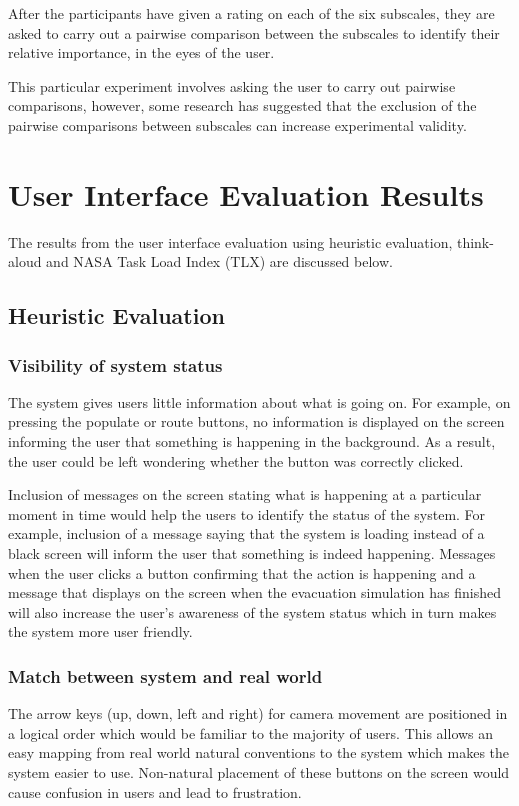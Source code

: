 After the participants have given a rating on each of the six subscales, they are asked to carry out a pairwise comparison between the subscales to identify their relative importance, in the eyes of the user.

This particular experiment involves asking the user to carry out pairwise comparisons, however, some research has suggested that the exclusion of the pairwise comparisons between subscales can increase experimental validity\cite{tlxinvariance}.

\section{User Interface Evaluation Results}
\label{results}

The results from the user interface evaluation using heuristic evaluation, think-aloud and NASA Task Load Index (TLX) are discussed below.

\subsection{Heuristic Evaluation}
\subsubsection{Visibility of system status}
The system gives users little information about what is going on. For example, on pressing the populate or route buttons, no information is displayed on the screen informing the user that something is happening in the background. As a result, the user could be left wondering whether the button was correctly clicked.

Inclusion of messages on the screen stating what is happening at a particular moment in time would help the users to identify the status of the system. For example, inclusion of a message saying that the system is loading instead of a black screen will inform the user that something is indeed happening. Messages when the user clicks a button confirming that the action is happening and a message that displays on the screen when the evacuation simulation has finished will also increase the user’s awareness of the system status which in turn makes the system more user friendly.

\subsubsection{Match between system and real world}
The arrow keys (up, down, left and right) for camera movement are positioned in a logical order which would be familiar to the majority of users. This allows an easy mapping from real world natural conventions to the system which makes the system easier to use. Non-natural placement of these buttons on the screen would cause confusion in users and lead to frustration.

